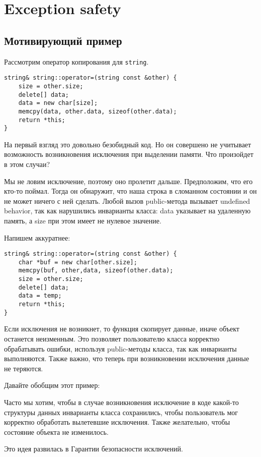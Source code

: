 \section{Exception safety}
\subsection{Мотивирующий пример}
Рассмотрим оператор копирования для \texttt{string}.
\begin{verbatim}
string& string::operator=(string const &other) {
    size = other.size;
    delete[] data;
    data = new char[size];
    memcpy(data, other.data, sizeof(other.data);
    return *this;
}
\end{verbatim}

На первый взгляд это довольно безобидный код. Но он совершено не учитывает возможность возникновения исключения при выделении памяти. Что произойдет в этом случаи?

Мы не ловим исключение, поэтому оно пролетит дальше. Предположим, что его кто-то поймал. Тогда он обнаружит, что наша строка в сломанном состоянии и он не может ничего с ней сделать. Любой вызов public-метода вызывает undefined behavior, так как нарушились инварианты класса: data указывает на удаленную память, а  size при этом имеет не нулевое значение.

Напишем аккуратнее:
\begin{verbatim}
string& string::operator=(string const &other) {
    char *buf = new char[other.size];
    memcpy(buf, other,data, sizeof(other.data);
    size = other.size;
    delete[] data;
    data = temp;
    return *this;
}
\end{verbatim}

Если исключения не возникнет, то функция скопирует данные, иначе объект останется неизменным. Это позволяет пользователю класса корректно обрабатывать ошибки, используя public-методы класса, так как инварианты выполняются. Также важно, что теперь при возникновении исключения данные не теряются.

Давайте обобщим этот пример:

Часто мы хотим, чтобы в случае возникновения исключение в коде какой-то структуры данных инварианты класса сохранились, чтобы пользователь мог корректно обработать вылетевшие исключения. Также желательно, чтобы состояние объекта не изменилось.

Это идея развилась в Гарантии безопасности исключений.

